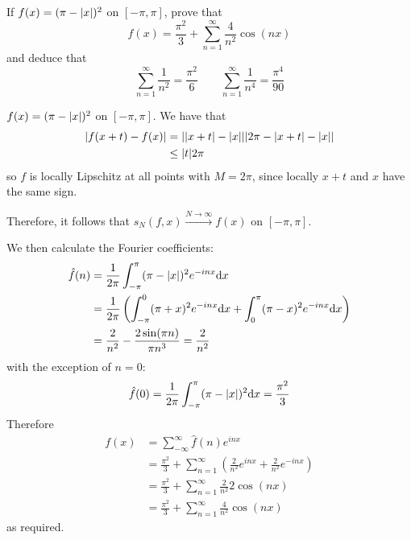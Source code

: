 \documentclass[a4paper, 12pt]{article}
\begin{document}
\begin{problem} 
    If $f(x) = (\pi - \lvert x\rvert)^2$ on $[-\pi, \pi]$, prove that \begin{equation*}
    f(x) = \frac{\pi^2}{3} + \sum_{n=1}^{\infty} \frac{4}{n^2} \cos (nx)
    \end{equation*}
    and deduce that \begin{equation*}
    \sum_{n=1}^{\infty}  \frac{1}{n^2} = \frac{\pi^2}{6} \qquad \sum_{n=1}^{\infty} \frac{1}{n^4} = \frac{\pi^4}{90}
    \end{equation*}
\end{problem}
\begin{solution}
    $f(x) = (\pi - \lvert x\rvert)^2$ on $[-\pi, \pi]$. We have that
    \begin{align*}
    \lvert f(x+t) - f(x)\rvert &= \lvert\lvert x+t\rvert - \lvert x\rvert\rvert \lvert2\pi - \lvert x+t\rvert - \lvert x\rvert\rvert \\
    &\leq  \lvert t\rvert 2\pi
    \end{align*}
    so $f$ is locally Lipschitz at all points with $M = 2\pi$, since locally $x+t$ and $x$ have the same sign.

    Therefore, it follows that $s_N(f, x) \xrightarrow{N \to \infty} f(x)$ on $[-\pi, \pi]$.

    We then calculate the Fourier coefficients:
    \begin{align*}
        \hat{f}(n) &= \frac{1}{2\pi} \int_{-\pi}^{\pi} (\pi - \lvert x\rvert)^2 e^{-inx} \mathrm{d} x \\
        &= \frac{1}{2\pi}\left( \int_{-\pi}^{0} (\pi + x)^2 e^{-inx} \mathrm{d} x + \int_{0}^{\pi} (\pi - x)^2 e^{-inx}\mathrm{d} x \right) \\
        &= \frac{2}{n^2} - \frac{2 \sin(\pi n)}{\pi n^3} = \frac{2}{n^2}
    \end{align*}
    with the exception of $n = 0$:
    \begin{equation*}
        \hat{f}(0) = \frac{1}{2\pi} \int_{-\pi}^{\pi} (\pi - \lvert x\rvert)^2 \mathrm{d} x = \frac{\pi^2}{3}   
    \end{equation*}
    Therefore \begin{align*}
    f(x) &= \sum_{-\infty}^{\infty} \hat{f}(n) e^{inx} \\
    &=  \frac{\pi^2}{3} + \sum_{n=1}^{\infty}\left( \frac{2}{n^2} e^{inx} + \frac{2}{n^2} e^{-inx} \right)\\
    &= \frac{\pi^2}{3} + \sum_{n=1}^{\infty} \frac{2}{n^2} 2 \cos(nx) \\
    &= \frac{\pi^2}{3} + \sum_{n=1}^{\infty} \frac{4}{n^2} \cos (nx)
    \end{align*}
    as required.


\end{solution}
\end{document}
